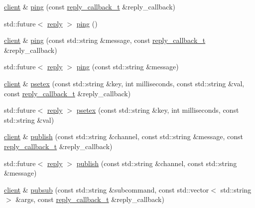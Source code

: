 \begin{DoxyCompactItemize}
\item 
\hyperlink{classcpp__redis_1_1client}{client} \& \hyperlink{classcpp__redis_1_1client_a19f0127614ca1369dcf739427079f7ec}{ping} (const \hyperlink{classcpp__redis_1_1client_a061a1140d36d2eaeda82b09a0bb3f9f2}{reply\+\_\+callback\+\_\+t} \&reply\+\_\+callback)
\item 
std\+::future$<$ \hyperlink{classcpp__redis_1_1reply}{reply} $>$ \hyperlink{classcpp__redis_1_1client_a5273cf454284e04f4c43e1b391170009}{ping} ()
\item 
\hyperlink{classcpp__redis_1_1client}{client} \& \hyperlink{classcpp__redis_1_1client_a399c32f46d82d844b661647f64d9fb97}{ping} (const std\+::string \&message, const \hyperlink{classcpp__redis_1_1client_a061a1140d36d2eaeda82b09a0bb3f9f2}{reply\+\_\+callback\+\_\+t} \&reply\+\_\+callback)
\item 
std\+::future$<$ \hyperlink{classcpp__redis_1_1reply}{reply} $>$ \hyperlink{classcpp__redis_1_1client_a5efa4ecc6b105a2464b22cd873caae39}{ping} (const std\+::string \&message)
\item 
\hyperlink{classcpp__redis_1_1client}{client} \& \hyperlink{classcpp__redis_1_1client_a732ba849342f9d8c67111f6cb6cb198c}{psetex} (const std\+::string \&key, int milliseconds, const std\+::string \&val, const \hyperlink{classcpp__redis_1_1client_a061a1140d36d2eaeda82b09a0bb3f9f2}{reply\+\_\+callback\+\_\+t} \&reply\+\_\+callback)
\item 
std\+::future$<$ \hyperlink{classcpp__redis_1_1reply}{reply} $>$ \hyperlink{classcpp__redis_1_1client_a69712c925c1496ab9531a5fd1888ad93}{psetex} (const std\+::string \&key, int milliseconds, const std\+::string \&val)
\item 
\hyperlink{classcpp__redis_1_1client}{client} \& \hyperlink{classcpp__redis_1_1client_a1fba121a3d6e50811448e35917badfc6}{publish} (const std\+::string \&channel, const std\+::string \&message, const \hyperlink{classcpp__redis_1_1client_a061a1140d36d2eaeda82b09a0bb3f9f2}{reply\+\_\+callback\+\_\+t} \&reply\+\_\+callback)
\item 
std\+::future$<$ \hyperlink{classcpp__redis_1_1reply}{reply} $>$ \hyperlink{classcpp__redis_1_1client_ad9a8434b4ca46e185bab45cf135c9ac2}{publish} (const std\+::string \&channel, const std\+::string \&message)
\item 
\hyperlink{classcpp__redis_1_1client}{client} \& \hyperlink{classcpp__redis_1_1client_a4c606e08e8787971044b76930b99f30d}{pubsub} (const std\+::string \&subcommand, const std\+::vector$<$ std\+::string $>$ \&args, const \hyperlink{classcpp__redis_1_1client_a061a1140d36d2eaeda82b09a0bb3f9f2}{reply\+\_\+callback\+\_\+t} \&reply\+\_\+callback)

\end{DoxyCompactItemize}
